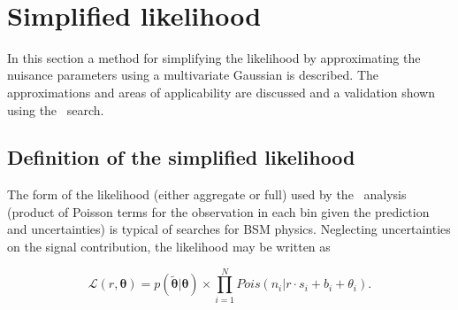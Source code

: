 \begin{figure}[!tbhp]
\begin{center}
     \\
  \end{center}
\end{figure}

\section{Simplified likelihood}

In this section a method for simplifying the likelihood by approximating the nuisance parameters
using a multivariate Gaussian is described. The approximations and areas of applicability 
are discussed and a validation shown using the \alphat~search.

\subsection{Definition of the simplified likelihood}

The form of the likelihood (either aggregate or full) used by the \alphat~analysis (product of Poisson terms 
for the observation in each bin given the prediction and uncertainties)
is typical of searches for BSM physics. Neglecting uncertainties on the signal contribution,
the likelihood may be written as 

\begin{equation}
\mathcal{L}(r,\boldsymbol{\theta}) = p(\tilde{\boldsymbol{\theta}}|\boldsymbol{\theta}) \times \prod_{i=1}^{N} Pois(n_{i}|r \cdot s_{i}+b_{i}+\theta_{i}).
\label{eq:poisson-prob}
\end{equation}

